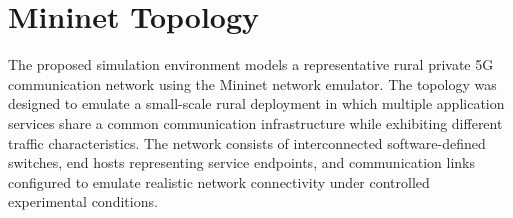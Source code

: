 \documentclass[12pt,a4paper]{report}
\begin{document}

	
	\section{Mininet Topology}
	\label{sec:mininet_topology}
	
	The proposed simulation environment models a representative rural private 5G communication network using the Mininet network emulator. The topology was designed to emulate a small-scale rural deployment in which multiple application services share a common communication infrastructure while exhibiting different traffic characteristics. The network consists of interconnected software-defined switches, end hosts representing service endpoints, and communication links configured to emulate realistic network connectivity under controlled experimental conditions.
	
\end{document}
